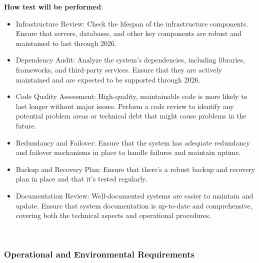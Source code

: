 \documentclass[12pt, titlepage]{article}
\begin{document}
\begin{enumerate}
\textbf{How test will be performed}: 
\begin{itemize}[noitemsep]
    \item Infrastructure Review: Check the lifespan of the infrastructure components. Ensure that servers, databases, and other key components are robust and maintained to last through 2026.
    \item Dependency Audit: Analyze the system's dependencies, including libraries, frameworks, and third-party services. Ensure that they are actively maintained and are expected to be supported through 2026.
    \item Code Quality Assessment: High-quality, maintainable code is more likely to last longer without major issues. Perform a code review to identify any potential problem areas or technical debt that might cause problems in the future.
    \item Redundancy and Failover: Ensure that the system has adequate redundancy and failover mechanisms in place to handle failures and maintain uptime.
    \item Backup and Recovery Plan: Ensure that there's a robust backup and recovery plan in place and that it's tested regularly.
    \item Documentation Review: Well-documented systems are easier to maintain and update. Ensure that system documentation is up-to-date and comprehensive, covering both the technical aspects and operational procedures.
\end{itemize}\\

\end{enumerate}


\subsubsection{Operational and Environmental Requirements}
\end{document}
